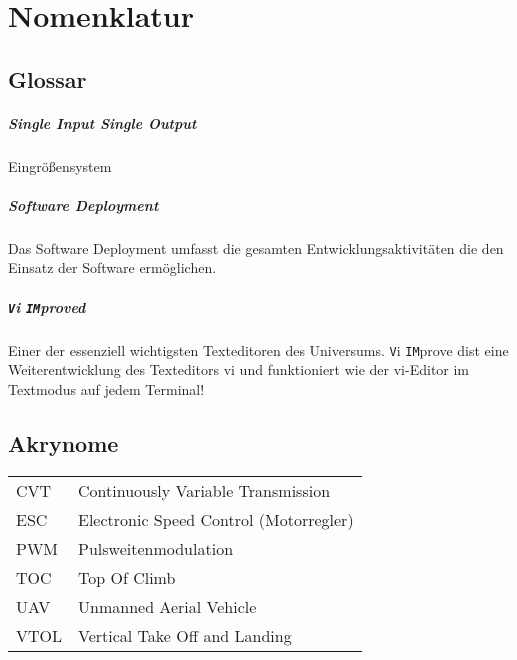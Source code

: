 %
\chapter*{Nomenklatur}
%
\section*{Glossar}
\paragraph{Single Input Single Output}
Eingrößensystem
\paragraph{Software Deployment}
Das Software Deployment umfasst die gesamten
Entwicklungsaktivitäten die den Einsatz der Software ermöglichen.
\paragraph{\texttt{V}i \texttt{IM}proved}
Einer der essenziell wichtigsten Texteditoren des Universums.
\texttt{V}i \texttt{IM}prove dist eine Weiterentwicklung des Texteditors
vi und funktioniert wie der vi-Editor im Textmodus auf jedem Terminal!
%
\section*{Akrynome}
\begin{longtable}{lp{13cm}}
	CVT & Continuously Variable Transmission \\
	ESC & Electronic Speed Control (Motorregler)\\
	PWM & Pulsweitenmodulation\\
	TOC & Top Of Climb\\
	UAV & Unmanned Aerial Vehicle\\
	VTOL & Vertical Take Off and Landing
\end{longtable}
%

